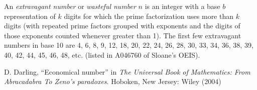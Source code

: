 \documentclass[12pt]{article}
\begin{document}
An {\em extravagant number} or {\em wasteful number} $n$ is an integer with a base $b$ representation of $k$ digits for which the prime factorization uses more than $k$ digits (with repeated prime factors grouped with exponents and the digits of those exponents counted whenever greater than 1). The first few extravagant numbers in base 10 are 4, 6, 8, 9, 12, 18, 20, 22, 24, 26, 28, 30, 33, 34, 36, 38, 39, 40, 42, 44, 45, 46, 48, etc. (listed in A046760 of Sloane's OEIS).

\begin{thebibliography}{1}
 D. Darling, ``Economical number'' in {\it The Universal Book of Mathematics: From Abracadabra To Zeno's paradoxes}. Hoboken, New Jersey: Wiley (2004)
\end{thebibliography}
\end{document}
